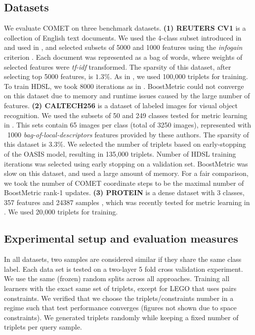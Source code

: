 \documentclass[twoside,11pt]{article}
\begin{document}
\subsection{Datasets}\vskip -5pt 
We evaluate COMET on three benchmark datasets.
\noindent \textbf{(1) REUTERS CV1} is a collection of English text documents. We used the 4-class subset introduced in \citep{CaiRCV14} and used in \citep{HDSL}, and selected subsets of 5000 and 1000 features using the \textit{infogain} criterion \citep{infogain}. Each document was represented as a bag of words, where weights of selected features were \textit{tf-idf} transformed. The sparsity of this dataset, after selecting top 5000 features, is $1.3\%$. As in \citet{HDSL}, we used 100,000 triplets for training. To train HDSL, we took 8000 iterations as in \citep{HDSL}. BoostMetric could not converge on this dataset due to memory and runtime issues caused by the large number of features. \textbf{(2) CALTECH256} is a dataset of labeled images for visual object recognition. We used the subsets of 50 and 249 classes tested for metric learning in \citep{OASIS}. This sets contain 65 images per class (total of 3250 images), represented with ~1000 \textit{bag-of-local-descriptors} features provided by these authors. The sparsity of this dataset is $3.3\%$. We selected the number of triplets based on early-stopping of the OASIS model, resulting in 
135,000 triplets. Number of HDSL training iterations was selected using early stopping on a validation set. BoostMetric was slow on this dataset, and used a large amount of memory. For a fair comparison, we took the number of COMET coordinate steps to be the maximal number of BoostMetric rank-1 updates. \textbf{(3) PROTEIN} is a dense dataset with 3 classes, 357 features and 24387 samples \citep{libsvm}, which was recently tested for metric learning in \citep{qian}. We used 20,000 triplets for training.


\vspace{-6pt}
\subsection{Experimental setup and evaluation measures}
\vskip -5pt
In all datasets, two samples are considered similar if they share the same class label. Each data set is tested on a two-layer 5 fold cross validation experiment. We use the same (frozen) random splits across all approaches. Training all learners with the exact same set of triplets, except for LEGO that uses pairs constraints. We verified that we choose the triplets/constraints number in a regime such that test performance converges (figures not shown due to space constraints). We generated triplets randomly while keeping a fixed number of triplets per query sample.
\end{document}
